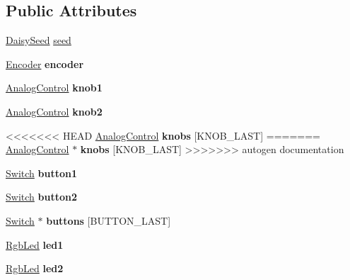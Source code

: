 \subsection*{Public Attributes}
\begin{DoxyCompactItemize}
\item 
\hyperlink{classdaisy_1_1_daisy_seed}{Daisy\+Seed} \hyperlink{classdaisy_1_1_daisy_pod_a75907b96ea78262bf52dd7b565136f58}{seed}
\item 
\mbox{\label{classdaisy_1_1_daisy_pod_a790738c358ea8febe63a367328a3eaf6}} 
\hyperlink{classdaisy_1_1_encoder}{Encoder} {\bfseries encoder}
\item 
\mbox{\label{classdaisy_1_1_daisy_pod_ae5e2f78a926443e6e7d79a074727ee41}} 
\hyperlink{classdaisy_1_1_analog_control}{Analog\+Control} {\bfseries knob1}
\item 
\mbox{\label{classdaisy_1_1_daisy_pod_af7afc0469d04116f8847025120a4fc70}} 
\hyperlink{classdaisy_1_1_analog_control}{Analog\+Control} {\bfseries knob2}
\item 
<<<<<<< HEAD
\mbox{\label{classdaisy_1_1_daisy_pod_a476ba6bfc64a8e8225e566f2d16d14c4}} 
\hyperlink{classdaisy_1_1_analog_control}{Analog\+Control} {\bfseries knobs} \mbox{[}K\+N\+O\+B\+\_\+\+L\+A\+ST\mbox{]}
=======
\mbox{\label{classdaisy_1_1_daisy_pod_a1ddf61e634293aaf600dd7fd01c47598}} 
\hyperlink{classdaisy_1_1_analog_control}{Analog\+Control} $\ast$ {\bfseries knobs} \mbox{[}K\+N\+O\+B\+\_\+\+L\+A\+ST\mbox{]}
>>>>>>> autogen documentation
\item 
\mbox{\label{classdaisy_1_1_daisy_pod_a9e2edc159de61e03b99fa5cf0d91f79e}} 
\hyperlink{classdaisy_1_1_switch}{Switch} {\bfseries button1}
\item 
\mbox{\label{classdaisy_1_1_daisy_pod_ac4a6df2ec7c2675f769d231e036231b9}} 
\hyperlink{classdaisy_1_1_switch}{Switch} {\bfseries button2}
\item 
\mbox{\label{classdaisy_1_1_daisy_pod_adc40296adf43258c9ac99bcf45a3554e}} 
\hyperlink{classdaisy_1_1_switch}{Switch} $\ast$ {\bfseries buttons} \mbox{[}B\+U\+T\+T\+O\+N\+\_\+\+L\+A\+ST\mbox{]}
\item 
\mbox{\label{classdaisy_1_1_daisy_pod_a25507d3d34053599b816f5a87a55d632}} 
\hyperlink{classdaisy_1_1_rgb_led}{Rgb\+Led} {\bfseries led1}
\item 
\mbox{\label{classdaisy_1_1_daisy_pod_a957be8135f17db1516599602f72daf5c}} 
\hyperlink{classdaisy_1_1_rgb_led}{Rgb\+Led} {\bfseries led2}
\end{DoxyCompactItemize}


